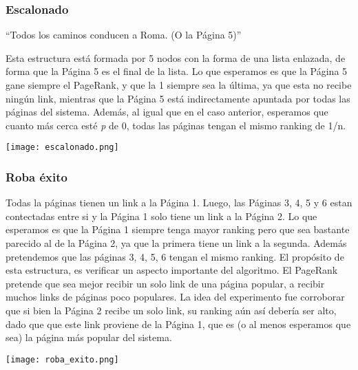 \subsubsection{Escalonado}
\centerline{ \enquote{Todos los caminos conducen a Roma. (O la Página 5)} }
Esta estructura está formada por 5 nodos con la forma de una lista enlazada, de forma que la Página 5 es el final de la lista.
Lo que esperamos es que la Página 5 gane siempre el PageRank, y que la 1 siempre sea la última, ya que esta no recibe ningún link, mientras que la Página 5 está indirectamente apuntada por todas las páginas del sistema.
Además, al igual que en el caso anterior, esperamos que cuanto más cerca esté \textit{p} de 0, todas las páginas tengan el mismo ranking de 1/n.

\begin{center}
\texttt{[image: escalonado.png]}
\end{center}


\subsubsection{Roba éxito}
Todas la páginas tienen un link a la Página 1. Luego, las Páginas 3, 4, 5 y 6 estan contectadas entre si y la Página 1 solo tiene un link a la Página 2.
Lo que esperamos es que la Página 1 siempre tenga mayor ranking pero que sea bastante parecido al de la Página 2, ya que la primera tiene un link a la segunda. Además pretendemos que las páginas 3, 4, 5, 6 tengan el mismo ranking.
El propósito de esta estructura, es verificar un aspecto importante del algoritmo. El PageRank pretende que sea mejor recibir un solo link de una página popular, a recibir muchos links de páginas poco populares.
La idea del experimento fue corroborar que si bien la Página 2 recibe un solo link, su ranking aún así debería ser alto, dado que
que este link proviene de la Página 1, que es (o al menos esperamos que sea) la página más popular del sistema. \\

\begin{center}
\texttt{[image: roba\_exito.png]}
\end{center}

